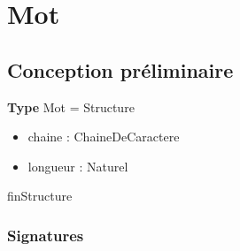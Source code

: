 	    
	\section*{Mot}
	\subsection*{Conception préliminaire}

	\textbf{Type} Mot = Structure
	\begin{itemize}[label=$\ $, leftmargin=2cm]
		 \item chaine : ChaineDeCaractere
		 \item longueur : Naturel
	\end{itemize}
	finStructure

	\subsubsection*{Signatures}

